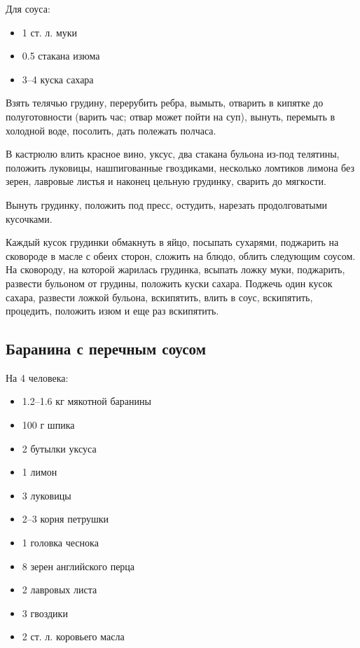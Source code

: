 Для соуса: 

\begin{itemize} 
	\item 1 ст. л. муки 
    \item 0.5 стакана изюма 
    \item 3–4 куска сахара
\end{itemize}

Взять телячью грудину, перерубить ребра, вымыть, отварить в кипятке до полуготовности (варить час; отвар может пойти на суп), вынуть, перемыть в холодной воде, посолить, дать полежать полчаса.

В кастрюлю влить красное вино, уксус, два стакана бульона из-под телятины, положить луковицы, нашпигованные гвоздиками, несколько ломтиков лимона без зерен, лавровые листья и наконец цельную грудинку, сварить до мягкости.

Вынуть грудинку, положить под пресс, остудить, нарезать продолговатыми кусочками.

Каждый кусок грудинки обмакнуть в яйцо, посыпать сухарями, поджарить на сковороде в масле с обеих сторон, сложить на блюдо, облить следующим соусом. На сковороду, на которой жарилась грудинка, всыпать ложку муки, поджарить, развести бульоном от грудины, положить куски сахара. Поджечь один кусок сахара, развести ложкой бульона, вскипятить, влить в соус, вскипятить, процедить, положить изюм и еще раз вскипятить.

\subsection{Баранина с перечным соусом}

На 4 человека:

\begin{itemize} 
	\item  1.2–1.6 кг мякотной баранины 
    \item 100 г шпика 
    \item 2 бутылки уксуса 
    \item 1 лимон 
    \item 3 луковицы 
    \item 2–3 корня петрушки 
    \item 1 головка чеснока 
    \item 8 зерен английского перца 
    \item 2 лавровых листа 
    \item 3 гвоздики 
    \item 2 ст. л. коровьего масла
\end{itemize}

